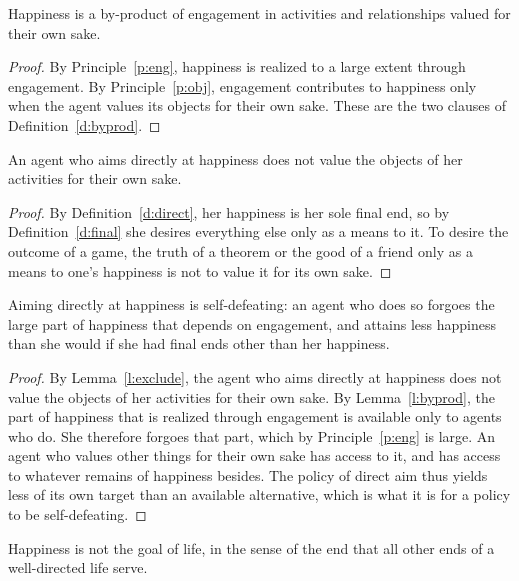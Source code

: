 \documentclass{situationist-preprint}
\begin{document}
\begin{lemma}\label{l:byprod}
Happiness is a by-product of engagement in activities and relationships valued for their own sake.
\end{lemma}

\begin{proof}
By Principle~\ref{p:eng}, happiness is realized to a large extent through engagement. By Principle~\ref{p:obj}, engagement contributes to happiness only when the agent values its objects for their own sake. These are the two clauses of Definition~\ref{d:byprod}.
\end{proof}

\begin{lemma}\label{l:exclude}
An agent who aims directly at happiness does not value the objects of her activities for their own sake.
\end{lemma}

\begin{proof}
By Definition~\ref{d:direct}, her happiness is her sole final end, so by Definition~\ref{d:final} she desires everything else only as a means to it. To desire the outcome of a game, the truth of a theorem or the good of a friend only as a means to one's happiness is not to value it for its own sake.
\end{proof}

\begin{theorem}\label{t:main}
Aiming directly at happiness is self-defeating: an agent who does so forgoes the large part of happiness that depends on engagement, and attains less happiness than she would if she had final ends other than her happiness.
\end{theorem}

\begin{proof}
By Lemma~\ref{l:exclude}, the agent who aims directly at happiness does not value the objects of her activities for their own sake. By Lemma~\ref{l:byprod}, the part of happiness that is realized through engagement is available only to agents who do. She therefore forgoes that part, which by Principle~\ref{p:eng} is large. An agent who values other things for their own sake has access to it, and has access to whatever remains of happiness besides. The policy of direct aim thus yields less of its own target than an available alternative, which is what it is for a policy to be self-defeating.
\end{proof}

\begin{corollary}\label{c:goal}
Happiness is not the goal of life, in the sense of the end that all other ends of a well-directed life serve.
\end{corollary}
\end{document}
